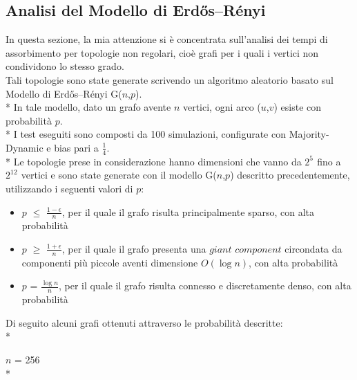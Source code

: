 \documentclass{article}
\begin{document}
\subsection{Analisi del Modello di Erdős–Rényi}
In questa sezione, la mia attenzione si è concentrata sull'analisi dei tempi di assorbimento per topologie non regolari, cioè grafi per i quali i vertici non condividono lo stesso grado.\\
Tali topologie sono state generate scrivendo un algoritmo aleatorio basato sul Modello di Erdős–Rényi G($n$,$p$).\\*
In tale modello, dato un grafo avente $n$ vertici, ogni arco ($u$,$v$) esiste con probabilità $p$.\\*
I test eseguiti sono composti da 100 simulazioni, configurate con Majority-Dynamic e bias pari a $\frac{1}{4}$.\\*
Le topologie prese in considerazione hanno dimensioni che vanno da $2^{5^{\mathrm{}}}$ fino a $2^{12^{\mathrm{}}}$ vertici e sono state generate con il modello G($n$,$p$) descritto precedentemente, utilizzando i seguenti valori di $p$:
\begin{itemize}
\item $p$ $\leq$ $\frac{1-\epsilon}{n}$, per il quale il grafo risulta principalmente sparso, con alta probabilità
\item $p$ $\geq$ $\frac{1+\epsilon}{n}$, per il quale il grafo presenta una $giant$ $component$ circondata da componenti più piccole aventi dimensione $O(\log{}n)$, con alta probabilità
\item $p$ = $\frac{\log{}n}{n}$, per il quale il grafo risulta connesso e discretamente denso, con alta probabilità
\end{itemize}

Di seguito alcuni grafi ottenuti attraverso le probabilità descritte:\\*

$n$ = 256\\*
\end{document}

